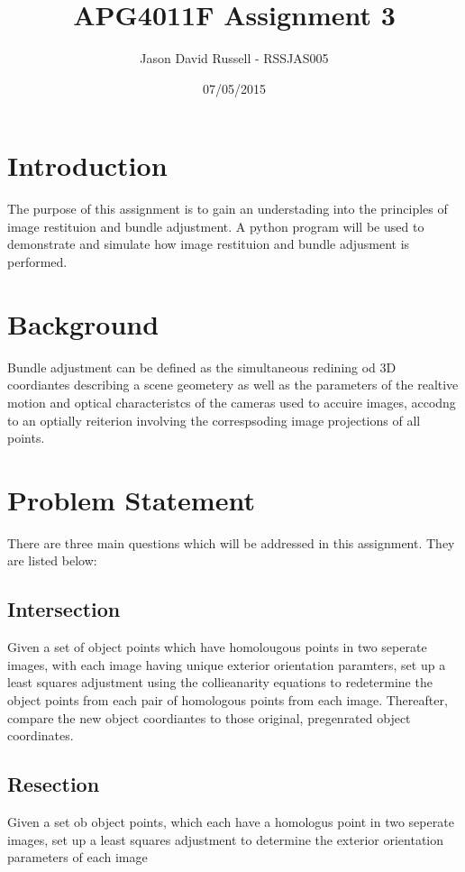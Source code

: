 \documentclass{article}
\title{APG4011F Assignment 3}
\date{07/05/2015}
\author{Jason David Russell - RSSJAS005}
\begin{document}
\maketitle
{}

\newpage
\tableofcontents


\newpage
\section{Introduction}
The purpose of this assignment is to gain an understading into the principles of image restituion and bundle adjustment.
A python program will be used to demonstrate and simulate how image restituion and bundle adjusment is performed.

\section{Background}
Bundle adjustment can be defined as the simultaneous redining od 3D coordiantes describing a scene geometery as well as the parameters of the realtive motion and optical characteristcs of the cameras used to accuire images, accodng to an optially reiterion involving the correspsoding image projections of all points.


\section{Problem Statement}
There are three main questions which will be addressed in this assignment. They are listed below:

\subsection{Intersection}
Given a set of object points which have homolougous points in two seperate images, with each image having unique exterior orientation paramters, set up a least squares adjustment using the collieanarity equations to redetermine the object points from each pair of homologous points from each image. Thereafter, compare the new object coordiantes to those original, pregenrated object coordinates.

\subsection{Resection}
Given a set ob object points, which each have a homologus point in two seperate images, set up a least squares adjustment to determine the exterior orientation parameters of each image
\end{document}
